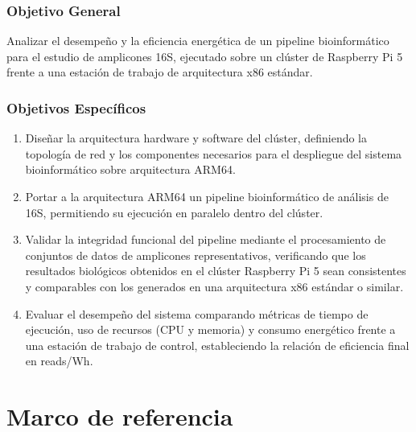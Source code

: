 \documentclass[12pt,oneside,spanish]{book}
\begin{document}
    \subsection*{Objetivo General}
    
    Analizar el desempeño y la eficiencia energética de un pipeline bioinformático para el estudio de amplicones 16S, ejecutado sobre un clúster de Raspberry Pi 5 frente a una estación de trabajo de arquitectura x86 estándar.
    
    \subsection*{Objetivos Específicos}
    
    \begin{enumerate}
        \item Diseñar la arquitectura hardware y software del clúster, definiendo la topología de red y los componentes necesarios para el despliegue del sistema bioinformático sobre arquitectura ARM64.
    
        \item Portar a la arquitectura ARM64 un pipeline bioinformático de análisis de 16S, permitiendo su ejecución en paralelo dentro del clúster.
    
        \item Validar la integridad funcional del pipeline mediante el procesamiento de conjuntos de datos de amplicones representativos, verificando que los resultados biológicos obtenidos en el clúster Raspberry Pi 5 sean consistentes y comparables con los generados en una arquitectura x86 estándar o similar.
    
        \item Evaluar el desempeño del sistema comparando métricas de tiempo de ejecución, uso de recursos (CPU y memoria) y consumo energético frente a una estación de trabajo de control, estableciendo la relación de eficiencia final en reads/Wh.
    \end{enumerate}
    
    
    \chapter{Marco de referencia}
    \label{cap:marco}
    
\end{document}
